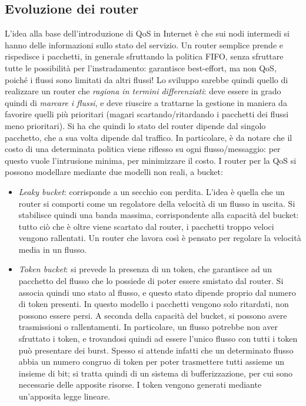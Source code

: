 \subsection{Evoluzione dei router}
L'idea alla base dell'introduzione di QoS in Internet è che sui nodi intermedi si hanno delle informazioni sullo stato
del servizio. Un router semplice prende e rispedisce i pacchetti, in generale sfruttando la politica FIFO, senza
sfruttare tutte le possibilità per l'instradamento: garantisce best-effort, ma non QoS, poiché i flussi sono limitati
da altri flussi!
Lo sviluppo sarebbe quindi quello di realizzare un router che \textit{ragiona in termini differenziati}: deve essere
in grado quindi di \textit{marcare i flussi}, e deve riuscire a trattarne la gestione in maniera da favorire
quelli più prioritari (magari scartando/ritardando i pacchetti dei flussi meno prioritari). Si ha che quindi
lo stato del router dipende dal singolo pacchetto, che a sua volta dipende dal traffico. In particolare, è da notare
che il costo di una determinata politica viene riflesso su ogni flusso/messaggio: per questo vuole l'intrusione minima, per minimizzare il costo.
I router per la QoS si possono modellare mediante due modelli non reali, a bucket:
\begin{itemize}
 \item \textit{Leaky bucket}: corrisponde a un secchio con perdita. L'idea è quella che un router si comporti come un
 regolatore della velocità di un flusso in uscita. Si stabilisce quindi una banda massima, corrispondente alla capacità del bucket:
 tutto ciò che è oltre viene scartato dal router, i pacchetti troppo veloci vengono rallentati. Un router che lavora così è pensato per regolare la velocità media in un flusso.
 \item \textit{Token bucket}: si prevede la presenza di un token, che garantisce ad un pacchetto del flusso che lo
 possiede di poter essere smistato dal router. Si associa quindi uno stato al flusso, e questo stato dipende proprio
 dal numero di token presenti. In questo modello i pacchetti vengono solo ritardati, non possono essere persi.
 A seconda della capacità del bucket, si possono avere trasmissioni o rallentamenti. In particolare, un flusso potrebbe
 non aver sfruttato i token, e trovandosi quindi ad essere l'unico flusso con tutti i token può presentare dei burst.
 Spesso si attende infatti che un determinato flusso abbia un numero congruo di token per poter trasmettere tutti
 assieme un insieme di bit; si tratta quindi di un sistema di bufferizzazione, per cui sono necessarie delle apposite
 risorse. I token vengono generati mediante un'apposita legge lineare.
\end{itemize}
